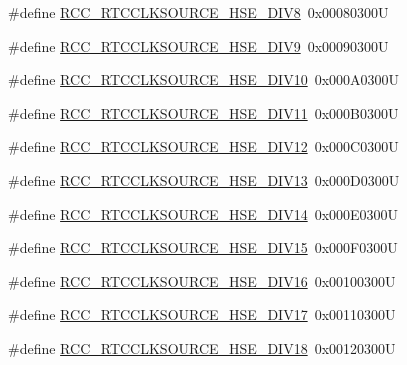 \begin{DoxyCompactItemize}
\#define \hyperlink{group___r_c_c___r_t_c___clock___source_gaf4f0209bbf068b427617f380e8e42490}{R\+C\+C\+\_\+\+R\+T\+C\+C\+L\+K\+S\+O\+U\+R\+C\+E\+\_\+\+H\+S\+E\+\_\+\+D\+I\+V8}~0x00080300U
\item 
\#define \hyperlink{group___r_c_c___r_t_c___clock___source_gafabded7bf1f0108152a9c2301fdbe251}{R\+C\+C\+\_\+\+R\+T\+C\+C\+L\+K\+S\+O\+U\+R\+C\+E\+\_\+\+H\+S\+E\+\_\+\+D\+I\+V9}~0x00090300U
\item 
\#define \hyperlink{group___r_c_c___r_t_c___clock___source_gab53e5fbbd7510563393fde77cfdde411}{R\+C\+C\+\_\+\+R\+T\+C\+C\+L\+K\+S\+O\+U\+R\+C\+E\+\_\+\+H\+S\+E\+\_\+\+D\+I\+V10}~0x000\+A0300U
\item 
\#define \hyperlink{group___r_c_c___r_t_c___clock___source_gae0ca4ffa1a26f99e377c56183ea68ec1}{R\+C\+C\+\_\+\+R\+T\+C\+C\+L\+K\+S\+O\+U\+R\+C\+E\+\_\+\+H\+S\+E\+\_\+\+D\+I\+V11}~0x000\+B0300U
\item 
\#define \hyperlink{group___r_c_c___r_t_c___clock___source_ga06837111cb6294d55f681347514a233d}{R\+C\+C\+\_\+\+R\+T\+C\+C\+L\+K\+S\+O\+U\+R\+C\+E\+\_\+\+H\+S\+E\+\_\+\+D\+I\+V12}~0x000\+C0300U
\item 
\#define \hyperlink{group___r_c_c___r_t_c___clock___source_ga2c447a815f2e116f88b604eeaa7aab0b}{R\+C\+C\+\_\+\+R\+T\+C\+C\+L\+K\+S\+O\+U\+R\+C\+E\+\_\+\+H\+S\+E\+\_\+\+D\+I\+V13}~0x000\+D0300U
\item 
\#define \hyperlink{group___r_c_c___r_t_c___clock___source_ga5dceac607cd03d87002cdb78b3234941}{R\+C\+C\+\_\+\+R\+T\+C\+C\+L\+K\+S\+O\+U\+R\+C\+E\+\_\+\+H\+S\+E\+\_\+\+D\+I\+V14}~0x000\+E0300U
\item 
\#define \hyperlink{group___r_c_c___r_t_c___clock___source_ga9594f8553a259c18fb354e903c01b041}{R\+C\+C\+\_\+\+R\+T\+C\+C\+L\+K\+S\+O\+U\+R\+C\+E\+\_\+\+H\+S\+E\+\_\+\+D\+I\+V15}~0x000\+F0300U
\item 
\#define \hyperlink{group___r_c_c___r_t_c___clock___source_ga48e1ffd844b9e9192c5d7dbeed20765f}{R\+C\+C\+\_\+\+R\+T\+C\+C\+L\+K\+S\+O\+U\+R\+C\+E\+\_\+\+H\+S\+E\+\_\+\+D\+I\+V16}~0x00100300U
\item 
\#define \hyperlink{group___r_c_c___r_t_c___clock___source_ga62707003a86f4c4747ae89af2e561e0c}{R\+C\+C\+\_\+\+R\+T\+C\+C\+L\+K\+S\+O\+U\+R\+C\+E\+\_\+\+H\+S\+E\+\_\+\+D\+I\+V17}~0x00110300U
\item 
\#define \hyperlink{group___r_c_c___r_t_c___clock___source_ga264428cbc7bc54bfcd794a4027ac1f5e}{R\+C\+C\+\_\+\+R\+T\+C\+C\+L\+K\+S\+O\+U\+R\+C\+E\+\_\+\+H\+S\+E\+\_\+\+D\+I\+V18}~0x00120300U
\item 

\end{DoxyCompactItemize}
